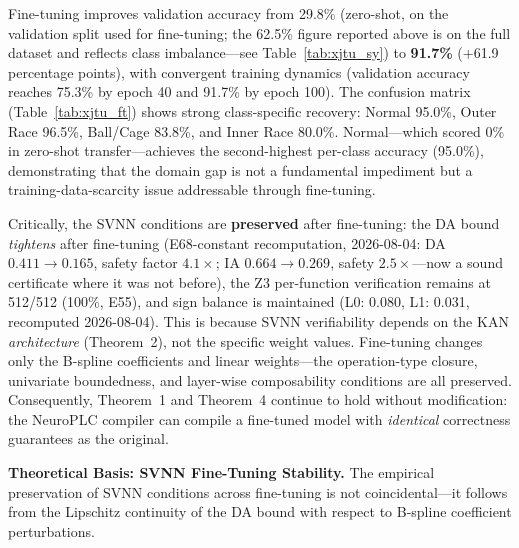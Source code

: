 \documentclass[journal,onecolumn]{IEEEtran}
\begin{document}
Fine-tuning improves validation accuracy from 29.8\% (zero-shot, on the
validation split used for fine-tuning; the 62.5\% figure reported above
is on the full dataset and reflects class imbalance---see
Table~\ref{tab:xjtu_sy}) to
\textbf{91.7\%} (+61.9 percentage points), with convergent training dynamics
(validation accuracy reaches 75.3\% by epoch 40 and 91.7\% by epoch 100).
The confusion matrix (Table~\ref{tab:xjtu_ft}) shows strong class-specific recovery:
Normal 95.0\%, Outer Race 96.5\%, Ball/Cage 83.8\%, and Inner Race 80.0\%.
Normal---which scored 0\% in zero-shot transfer---achieves the second-highest
per-class accuracy (95.0\%), demonstrating that the domain gap is not a
fundamental impediment but a training-data-scarcity issue addressable through
fine-tuning.

Critically, the SVNN conditions are \textbf{preserved} after fine-tuning:
the DA bound \textit{tightens} after fine-tuning (E68-constant
recomputation, 2026-08-04: DA $0.411 \to 0.165$, safety factor
$4.1\times$; IA $0.664 \to 0.269$, safety $2.5\times$---now a sound
certificate where it was not before), the Z3 per-function
verification remains at 512/512 (100\%, E55), and sign balance is
maintained (L0: 0.080, L1: 0.031, recomputed 2026-08-04). This is because SVNN
verifiability depends on the KAN \textit{architecture} (Theorem~2),
not the specific weight values. Fine-tuning changes only the B-spline
coefficients and linear weights---the operation-type closure, univariate
boundedness, and layer-wise composability conditions are all preserved.
Consequently, Theorem~1 and Theorem~4 continue to hold without
modification: the NeuroPLC compiler can compile a fine-tuned model
with \textit{identical} correctness guarantees as the original.

\vspace{4pt}
\noindent\textbf{Theoretical Basis: SVNN Fine-Tuning Stability.}
The empirical preservation of SVNN conditions across fine-tuning is not
coincidental---it follows from the Lipschitz continuity of the DA bound
with respect to B-spline coefficient perturbations.
\end{document}
